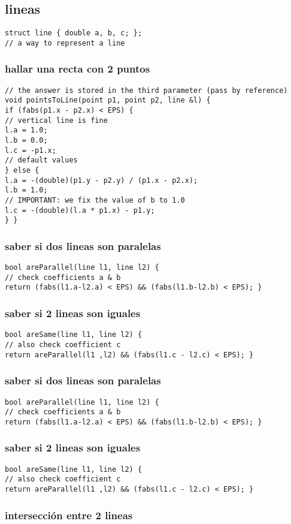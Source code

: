 \subsection{lineas}
\begin{lstlisting}[style=C]
struct line { double a, b, c; };
// a way to represent a line
\end{lstlisting}
\subsubsection{hallar una recta con 2 puntos}
\begin{lstlisting}[style=C]
// the answer is stored in the third parameter (pass by reference)
void pointsToLine(point p1, point p2, line &l) {
if (fabs(p1.x - p2.x) < EPS) {
// vertical line is fine
l.a = 1.0;
l.b = 0.0;
l.c = -p1.x;
// default values
} else {
l.a = -(double)(p1.y - p2.y) / (p1.x - p2.x);
l.b = 1.0;
// IMPORTANT: we fix the value of b to 1.0
l.c = -(double)(l.a * p1.x) - p1.y;
} }
\end{lstlisting}
\subsubsection{saber si dos lineas son paralelas}
\begin{lstlisting}[style=C]
bool areParallel(line l1, line l2) {
// check coefficients a & b
return (fabs(l1.a-l2.a) < EPS) && (fabs(l1.b-l2.b) < EPS); }
\end{lstlisting}
\subsubsection{saber si 2 lineas son iguales}
\begin{lstlisting}[style=C]
bool areSame(line l1, line l2) {
// also check coefficient c
return areParallel(l1 ,l2) && (fabs(l1.c - l2.c) < EPS); }
\end{lstlisting}
\subsubsection{saber si dos lineas son paralelas}
\begin{lstlisting}[style=C]
bool areParallel(line l1, line l2) {
// check coefficients a & b
return (fabs(l1.a-l2.a) < EPS) && (fabs(l1.b-l2.b) < EPS); }
\end{lstlisting}
\subsubsection{saber si 2 lineas son iguales}
\begin{lstlisting}[style=C]
bool areSame(line l1, line l2) {
// also check coefficient c
return areParallel(l1 ,l2) && (fabs(l1.c - l2.c) < EPS); }
\end{lstlisting}
\subsubsection{intersección entre 2 lineas}
